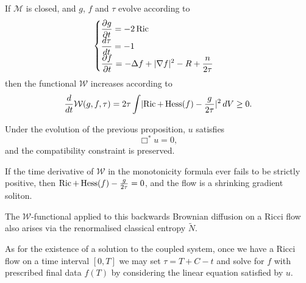 \begin{proposition}
\label{topping-ch8-monotonicity}
If $\mathcal M$ is closed, and $g$, $f$ and $\tau$ evolve according to
\[
\begin{cases}
\displaystyle \frac{\partial g}{\partial t} = -2\operatorname{Ric} \\
\displaystyle \frac{d\tau}{dt} = -1 \\
\displaystyle \frac{\partial f}{\partial t} = -\Delta f + \lvert \nabla f\rvert^{2} - R + \frac{n}{2\tau}
\end{cases}
\]
then the functional $\mathcal W$ increases according to
\[
\frac{d}{dt}\mathcal W(g,f,\tau) = 2\tau \int \lvert \operatorname{Ric} + \operatorname{Hess}(f) - \frac{g}{2\tau}\rvert^{2} \,dV \geq 0.
\]
\end{proposition}

\begin{remark}
\label{topping-ch8-compatibility-preserved}
Under the evolution of the previous proposition, $u$ satisfies
\[
\Box^{*}u = 0,
\]
and the compatibility constraint is preserved.
\end{remark}

\begin{remark}
\label{topping-ch8-shrinking-soliton}
If the time derivative of $\mathcal W$ in the monotonicity formula ever fails to
be strictly positive, then $\operatorname{Ric} + \operatorname{Hess}(f) - \frac{g}{2\tau} = 0$, and the
flow is a shrinking gradient soliton.
\end{remark}

\begin{remark}
\label{topping-ch8-classical-entropy-link}
The $\mathcal W$-functional applied to this backwards Brownian diffusion on a
Ricci flow also arises via the renormalised classical entropy $\tilde N$.
\end{remark}

\begin{remark}
\label{topping-ch8-existence-of-coupled-system}
As for the existence of a solution to the coupled system, once we have a Ricci
flow on a time interval $[0,T]$ we may set $\tau = T + C - t$ and solve for
$f$ with prescribed final data $f(T)$ by considering the linear equation
satisfied by $u$.
\end{remark}

